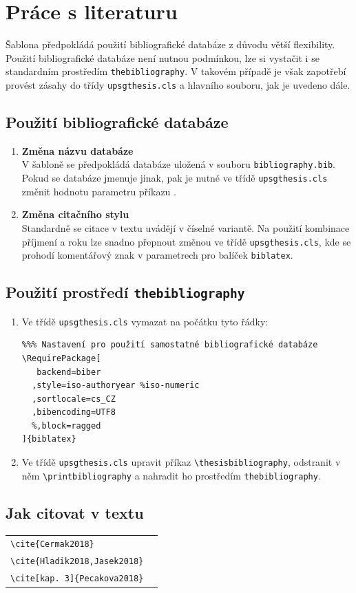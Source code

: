 
\chapter{Práce s literaturu}

Šablona předpokládá použití bibliografické databáze z důvodu větší flexibility. Použití bibliografické databáze není nutnou podmínkou, lze si vystačit i se standardním prostředím \texttt{thebibliography}. V takovém případě je však zapotřebí provést zásahy do třídy \texttt{upsgthesis.cls} a hlavního souboru, jak je uvedeno dále.

\section{Použití bibliografické databáze}

\begin{enumerate}
\item\textbf{Změna názvu databáze}\\
V šabloně se předpokládá databáze uložená v souboru \texttt{bibliography.bib}. Pokud se databáze jmenuje jinak, pak je nutné ve třídě \texttt{upsgthesis.cls} změnit hodnotu parametru příkazu \verb''.
\item\textbf{Změna citačního stylu}\\
Standardně se citace v textu uvádějí v číselné variantě. Na použití kombinace příjmení a roku lze snadno přepnout změnou ve třídě \texttt{upsgthesis.cls}, kde se prohodí komentářový znak v parametrech pro balíček \texttt{biblatex}.
\end{enumerate}


\section{Použití prostředí \texttt{thebibliography}}
\begin{enumerate}
\item Ve třídě \texttt{upsgthesis.cls} vymazat na počátku tyto řádky:
\begin{verbatim}
%%% Nastavení pro použití samostatné bibliografické databáze
\RequirePackage[
   backend=biber
  ,style=iso-authoryear %iso-numeric
  ,sortlocale=cs_CZ
  ,bibencoding=UTF8
  %,block=ragged
]{biblatex}

\end{verbatim}
\item Ve třídě \texttt{upsgthesis.cls} upravit příkaz \verb'\thesisbibliography', odstranit v něm \verb'\printbibliography' a nahradit ho prostředím \texttt{thebibliography}.
\end{enumerate}


\section{Jak citovat v textu}
\begin{center}
\begin{tabular}{l@{~~$\longrightarrow$~~}l}
\verb|\cite{Cermak2018}|&\cite{Cermak2018}\\
\verb|\cite{Hladik2018,Jasek2018}|&\cite{Hladik2018,Jasek2018}\\
\verb|\cite[kap. 3]{Pecakova2018}|&\cite[kap. 3]{Pecakova2018}\\
\end{tabular}
\end{center}
